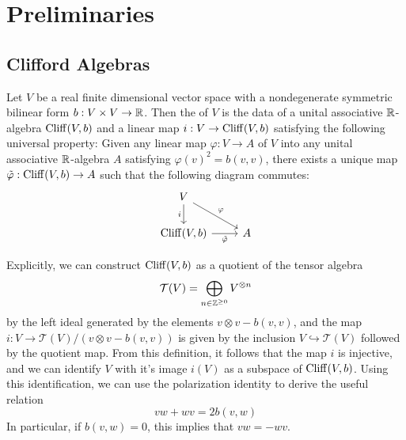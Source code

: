 \chapter{Preliminaries}
%
\section{Clifford Algebras}
%
\begin{defn}
Let $V$ be a real finite dimensional vector space with a nondegenerate
symmetric bilinear form $b : V \times V \to \mathbb{R}$. Then the 
of $V$ is the data of a unital associative $\mathbb{R}$-algebra $\operatorname{Cliff}(V,b)$ and a linear
map $i : V \to \operatorname{Cliff}(V,b)$ satisfying the following universal property:
Given any linear map $\varphi : V \to A$ of $V$ into any unital associative
$\mathbb{R}$-algebra $A$ satisfying $\varphi(v)^2 = b(v,v)$, there exists a unique map
$\tilde{\varphi}: \operatorname{Cliff}(V,b) \to A$ such that the following diagram commutes:
%
\[\begin{tikzcd}
V \ar[dr, "\varphi"] \ar[d, "i"'] \\
\Cliff(V,b) \ar[r, "\tilde{\varphi}"'] & A
\end{tikzcd}\]
\end{defn}
%
Explicitly, we can construct $\operatorname{Cliff}(V,b)$ as a quotient of the tensor algebra
\[
\mathcal{T}(V) = \bigoplus_{n \in \mathbb{Z}^{\geq 0}} V^{\otimes n}
\]
by the left ideal generated by the elements $v \otimes v - b(v,v)$, and
the map $i: V \to \mathcal{T}(V) / (v \otimes v - b(v,v))$ is given by the
inclusion $V \hookrightarrow \mathcal{T}(V)$ followed by the quotient map.
From this definition, it follows that the map $i$ is injective, and we can
identify $V$ with it's image $i(V)$ as a subspace of $\operatorname{Cliff}(V,b)$. Using
this identification, we can use the polarization identity to derive the useful
relation
\[
vw + wv = 2b(v,w)
\]
In particular, if $b(v,w) = 0$, this implies that $vw = -wv$.\\

